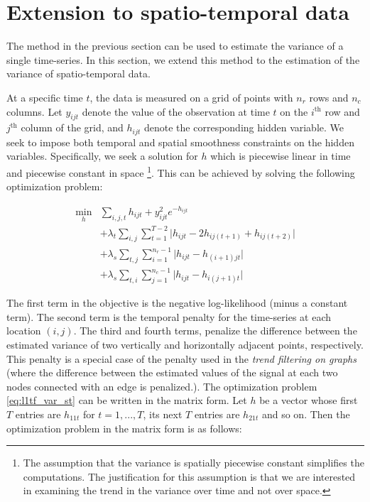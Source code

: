 \documentclass[review]{elsarticle}
\begin{document}

\section{Extension to spatio-temporal data}
\label{sec:exten}

The method in the previous section can be used to estimate the variance of a single time-series. In this section, we extend this method to the estimation of the variance of spatio-temporal data.

At a specific time $t$, the data is measured on a grid of points with $n_r$ rows and $n_c$ columns. Let $y_{ijt}$ denote the value of the observation at time $t$ on the $i^\text{th}$ row and $j^\text{th}$ column of the grid, and $h_{ijt}$ denote the corresponding hidden variable. We seek to impose both temporal and spatial smoothness constraints on the hidden variables. Specifically, we seek a solution for $h$ which is piecewise linear in time and piecewise constant in space \footnote{The assumption that the variance is spatially piecewise constant simplifies the computations. The justification for this assumption is that we are interested in examining the trend in the variance over time and not over space.}. This can be achieved by solving the following optimization problem:

\begin{equation}
\begin{aligned}
\min_h &\sum_{i,j,t}h_{ijt}+y_{ijt}^2e^{-h_{ijt}}\\
&+\lambda_t \sum_{i,j} \sum_{t=1}^{T-2} \big|h_{ijt}-2h_{ij(t+1)}+h_{ij(t+2)}\big|\\
&+\lambda_s \sum_{t,j} \sum_{i=1}^{n_r-1} \big|h_{ijt}-h_{(i+1)jt}\big|\\
&+\lambda_s \sum_{t,i} \sum_{j=1}^{n_c-1} \big|h_{ijt}-h_{i(j+1)t}\big|
\end{aligned}
\label{eq:l1tf_var_st}
\end{equation}

The first term in the objective is the negative log-likelihood (minus a constant term). The second term is the temporal penalty for the time-series at each location $(i,j)$. The third and fourth terms, penalize the difference between the estimated variance of two vertically and horizontally adjacent points, respectively. This penalty is a special case of the penalty used in the \textit{trend filtering on graphs }\cite{wang_trend_2016} (where the difference between the estimated values of the signal at each two nodes connected with an edge is penalized.). The optimization problem \ref{eq:l1tf_var_st} can be written in the matrix form. Let $h$ be a vector whose first $T$ entries are $h_{11t}$ for $t=1,...,T$, its next $T$ entries are $h_{21t}$ and so on. Then the optimization problem in the matrix form is as follows:
\end{document}
